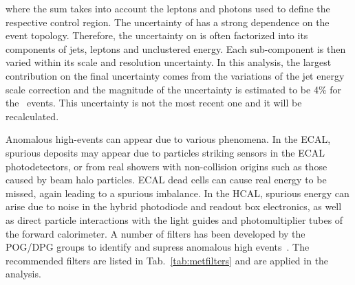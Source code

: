 where the sum takes into account the leptons and photons used to define the respective control region.
The uncertainty of \ptmiss has a strong dependence on the
event topology. Therefore, the uncertainty on \ptmiss is often factorized into its components of
jets, leptons and unclustered energy. Each sub-component is then varied
within its scale and resolution uncertainty. In this analysis, the largest
contribution on the final \ptmiss uncertainty comes from the variations of the
jet energy scale correction and the magnitude of the uncertainty is estimated
to be 4\% for the \Zvvjets~events. This uncertainty is not the most recent one and it will be recalculated.

Anomalous high-\ptmiss events can appear due to various phenomena.
In the ECAL, spurious deposits may appear due to particles striking
sensors in the ECAL photodetectors, or from real showers with non-collision
origins such as those caused by beam halo particles. ECAL dead cells can cause real
energy to be missed, again leading to a spurious imbalance.
In the HCAL, spurious energy can arise due to  noise in the hybrid
photodiode and readout box  electronics, as well as
direct particle interactions with  the light guides and
photomultiplier tubes of the forward calorimeter. 
A number of filters has been developed by the POG/DPG groups to identify and supress anomalous high
\ptmiss events~\cite{CMS-JME-TWIKI-FILTER}. The recommended filters are listed in Tab.~\ref{tab:metfilters} and are applied in the analysis.

